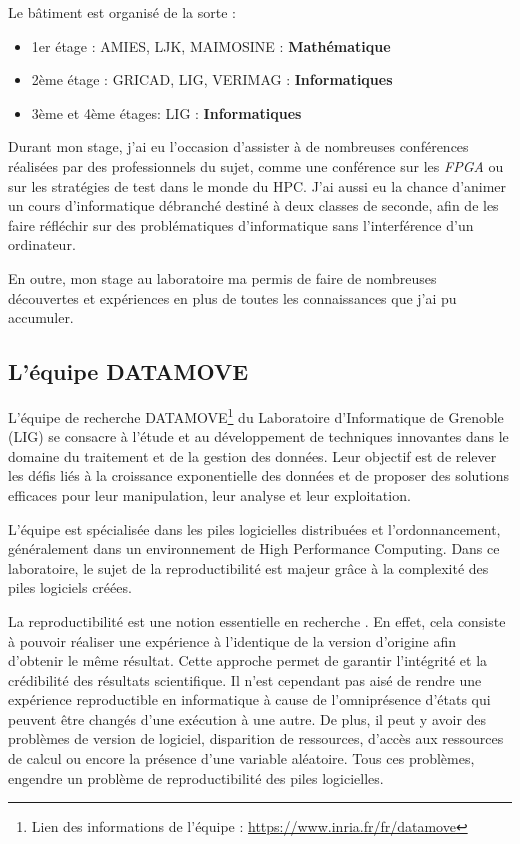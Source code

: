\documentclass[a4paper,french,12pt, titlepage]{article}
\begin{document}
Le bâtiment est organisé de la sorte :

\begin{itemize}
\item
  1er étage : AMIES, LJK, MAIMOSINE : \textbf{Mathématique}
\item
  2ème étage : GRICAD, LIG, VERIMAG : \textbf{Informatiques}
\item
  3ème et 4ème étages: LIG : \textbf{Informatiques}\newline
\end{itemize}

Durant mon stage, j'ai eu l'occasion d'assister à de nombreuses
conférences réalisées par des professionnels du sujet, comme une
conférence sur les \emph{FPGA} ou sur les stratégies de test dans le
monde du HPC. J'ai aussi eu la chance d'animer un cours d'informatique
débranché destiné à deux classes de seconde, afin de les faire réfléchir
sur des problématiques d'informatique sans l'interférence d'un
ordinateur.\newline

En outre, mon stage au laboratoire ma permis de faire de nombreuses
découvertes et expériences en plus de toutes les connaissances que j'ai
pu accumuler.

\hypertarget{luxe9quipe-datamove}{%
\subsection{L'équipe DATAMOVE}\label{luxe9quipe-datamove}}

L'équipe de recherche
DATAMOVE\footnote{Lien des informations de l'équipe : \url{https://www.inria.fr/fr/datamove}}
du Laboratoire d'Informatique de Grenoble (LIG) se consacre à l'étude et
au développement de techniques innovantes dans le domaine du traitement
et de la gestion des données. Leur objectif est de relever les défis
liés à la croissance exponentielle des données et de proposer des
solutions efficaces pour leur manipulation, leur analyse et leur
exploitation.\newline

L'équipe est spécialisée dans les piles logicielles distribuées et
l'ordonnancement, généralement dans un environnement de High Performance
Computing. Dans ce laboratoire, le sujet de la \gls{reproductibilité}
est majeur grâce à la complexité des piles logiciels créées.\newline

La reproductibilité est une notion essentielle en recherche
\cite{reproductibility2017}. En effet, cela consiste à pouvoir réaliser
une expérience à l'identique de la version d'origine afin d'obtenir le
même résultat. Cette approche permet de garantir l'intégrité et la
crédibilité des résultats scientifique. Il n'est cependant pas aisé de
rendre une expérience reproductible en informatique à cause de
l'omniprésence d'états qui peuvent être changés d'une exécution à une
autre. De plus, il peut y avoir des problèmes de version de logiciel,
disparition de ressources, d'accès aux ressources de calcul ou encore la
présence d'une variable aléatoire. Tous ces problèmes, engendre un
problème de reproductibilité des piles logicielles.\newline
\end{document}
